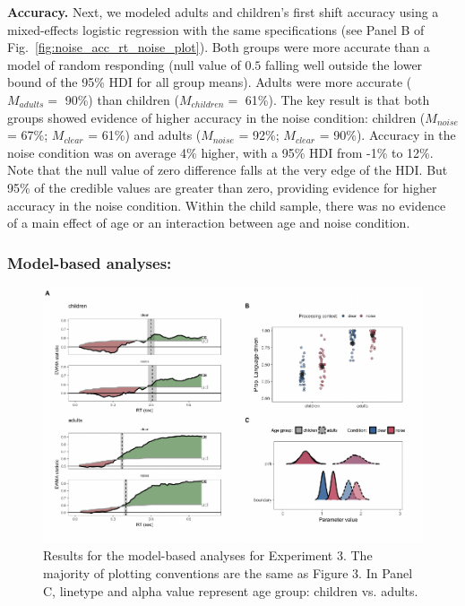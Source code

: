 \documentclass[english,floatsintext,man]{apa6}
\theoremstyle{definition}
\theoremstyle{definition}
\theoremstyle{definition}
\theoremstyle{remark}
\begin{document}
\textbf{Accuracy.} Next, we modeled adults and children's first shift
accuracy using a mixed-effects logistic regression with the same
specifications (see Panel B of Fig.~\ref{fig:noise_acc_rt_noise_plot}).
Both groups were more accurate than a model of random responding (null
value of \(0.5\) falling well outside the lower bound of the 95\% HDI
for all group means). Adults were more accurate (\(M_{adults} =\) 90\%)
than children (\(M_{children} =\) 61\%). The key result is that both
groups showed evidence of higher accuracy in the noise condition:
children (\(M_{noise}\) = 67\%; \(M_{clear}\) = 61\%) and adults
(\(M_{noise}\) = 92\%; \(M_{clear}\) = 90\%). Accuracy in the noise
condition was on average 4\% higher, with a 95\% HDI from -1\% to 12\%.
Note that the null value of zero difference falls at the very edge of
the HDI. But 95\% of the credible values are greater than zero,
providing evidence for higher accuracy in the noise condition. Within
the child sample, there was no evidence of a main effect of age or an
interaction between age and noise condition.

\hypertarget{model-based-analyses-2}{%
\subsubsection{Model-based analyses:}\label{model-based-analyses-2}}

\begin{figure}[H]

{\centering \includegraphics[width=0.9\linewidth]{figs/noise-model-plots-1} 

}

\caption{Results for the model-based analyses for Experiment 3. The majority of plotting conventions are the same as Figure 3. In Panel C, linetype and alpha value represent age group: children vs. adults.}\label{fig:noise-model-plots}
\end{figure}
\end{document}
